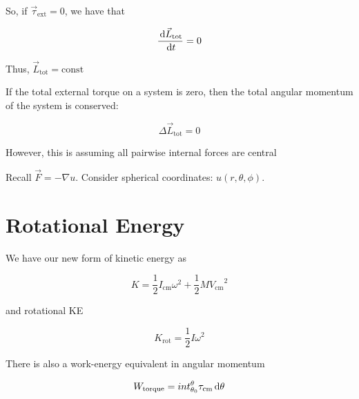 So, if $\vec\tau_\mathrm{ext} = 0$, we have that

\begin{equation}
	\frac{\D \vec L_\mathrm{tot}}{\D t} = 0
\end{equation}

Thus, $\vec L_\mathrm{tot} = \text{const}$

\begin{theorem}
	If the total external torque on a system is zero, then the total angular momentum of the system is conserved:

	\begin{equation}
		\Delta \vec L_\mathrm{tot} = 0
	\end{equation}

	\begin{remark}
		However, this is assuming all pairwise internal forces are central
	\end{remark}
\end{theorem}

Recall $\vec F = -\nabla u$. Consider spherical coordinates: $u(r,\theta,\phi)$.


\section{Rotational Energy}


\begin{definition}
	We have our new form of kinetic energy as

	\begin{equation}
		K = \frac{1}{2} I_\mathrm{cm} \omega^2 + \frac{1}{2} M {V_\mathrm{cm}}^2
	\end{equation}

	and rotational KE

	\begin{equation}
		K_\mathrm{rot} = \frac{1}{2} I \omega^2
	\end{equation}
\end{definition}

There is also a work-energy equivalent in angular momentum

\begin{equation}
	W_\mathrm{torque} = int_{\theta_0}^\theta \tau_\mathrm{cm} \D \theta
\end{equation}